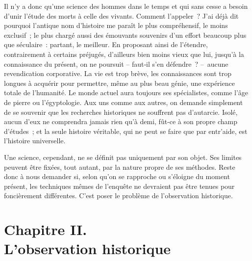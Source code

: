 \documentclass[french,twoside]{book} %
\newcommand{\astermono}{\medskip\centerline{\color{rubric}\large\selectfont{\syms ✻}}\medskip\par}%
\begin{document}
\astermono

\noindent Il n’y a donc qu’une science des hommes dans le temps et qui sans cesse a besoin d’unir l’étude des morts à celle des vivants. Comment l’appeler ? J’ai déjà dit pourquoi l’antique nom d’histoire me paraît le plus compréhensif, le moins exclusif ; le plus chargé aussi des émouvants souvenirs d’un effort beaucoup plus que séculaire : partant, le meilleur. En proposant ainsi de l’étendre, contrairement à certains préjugés, d’ailleurs bien moins vieux que lui, jusqu’à la connaissance du présent, on ne pour­suit – faut‑il s’en défendre ? – aucune revendication corporative. La vie est trop brève, les connaissances sont trop longues à acquérir pour permettre, même au plus beau génie, une expérience totale de l’humanité. Le monde actuel aura toujours ses spécialistes, comme l’âge de pierre ou l’égyptologie. Aux uns comme aux autres, on demande simplement de se souvenir que les recherches historiques ne souffrent pas d’autarcie. Isolé, aucun d’eux ne comprendra jamais rien qu’à demi, fût‑ce à son propre champ d’études ; et la seule histoire véritable, qui ne peut se faire que par entr’aide, est l’histoire universelle.\par
\label{p16} Une science, cependant, ne se définit pas uniquement par son objet. Ses limites peuvent être fixées, tout autant, par la nature propre de ses méthodes. Reste donc à nous demander si, selon qu’on se rapproche ou s’éloigne du moment présent, les techniques mêmes de l’enquête ne de­vraient pas être tenues pour foncièrement différentes. C’est poser le problème de l’observation historique.
\section[{Chapitre II. L’observation historique}]{Chapitre II. \\
L’observation historique}\renewcommand{\leftmark}{Chapitre II. \\
L’observation historique}
\end{document}
